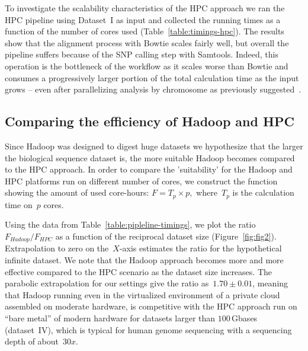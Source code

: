 \documentclass[10pt]{article}
\newcommand{\Fixme}[1]{{\color{FixmeColor}{#1}}}
\newcommand{\COM}[1]{{\color{blue} #1 }}
\begin{document}
To investigate the scalability characteristics of the HPC approach we ran the
HPC pipeline using Dataset~I as input and collected the running times as a
function of the number of cores used (Table~\ref{table:timings-hpc}). The results show that the
alignment process with Bowtie scales fairly well, but overall the pipeline
suffers because of the SNP calling step with Samtools. Indeed, this operation
is the bottleneck of the workflow as it scales
worse than Bowtie and consumes a progressively larger portion of the total
calculation time as the input grows -- even after parallelizing analysis by
chromosome as previously suggested~\cite{biostars_samtools}.



\subsection*{Comparing the efficiency of Hadoop and HPC}
\Fixme{New heading propsal: Efficiency of calculations}

Since Hadoop was designed to digest huge datasets\cite{hadoop,lin2010} we hypothesize that the larger the biological sequence dataset is, the more suitable Hadoop becomes compared to the HPC approach. In order to compare the 'suitability' for the Hadoop and HPC platforms run on different number of cores, we construct the function showing the amount of used core-hours:
$F=T_{p}\times p,$ where~$T_{p}$ is the calculation time on~$p$ cores. 

Using the data from Table~\ref{table:pipleline-timings}, we plot the ratio $F_{Hadoop}/F_{HPC}$ as a function of the reciprocal dataset size (Figure~\ref{fig:fig2}). Extrapolation to zero on the~$X$-axis estimates the ratio for the hypothetical infinite dataset. We note that the Hadoop approach becomes more and more effective compared to the HPC scenario as the dataset size increases. 
The parabolic extrapolation for our settings give the ratio as~$1.70\pm0.01$, meaning that Hadoop running even in the virtualized environment of a private cloud assembled on moderate hardware, is competitive with the HPC approach run on ``bare metal'' of modern hardware for datasets larger than $100$\,Gbases (dataset~IV), which is typical for human genome sequencing with a sequencing depth of about~$30x$.
\end{document}
